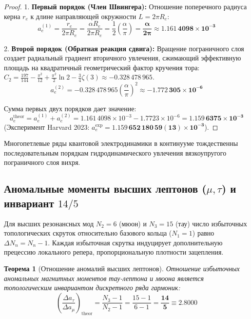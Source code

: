\documentclass[12pt,a4paper]{article}
\newtheorem{theorem}{Теорема}
\begin{document}
	\begin{proof}
		1. \textbf{Первый порядок (Член Швингера):} Отношение поперечного радиуса керна $r_e$ к длине направляющей окружности $L = 2\pi R_e$:
		\begin{equation}
			a_e^{(1)} = \frac{r_e}{2\pi R_e} = \frac{\alpha R_e}{2\pi R_e} = \frac{1}{2} \left(\frac{\alpha}{\pi}\right) = \mathbf{\frac{\alpha}{2\pi}} \approx \mathbf{1.161\,4098 \times 10^{-3}}
		\end{equation}
		
		2. \textbf{Второй порядок (Обратная реакция сдвига):} Вращение пограничного слоя создает радиальный градиент вторичного увлечения, сжимающий эффективную площадь на квадратичный геометрический фактор кручения тора: $C_2 = \frac{197}{144} - \frac{\pi^2}{12} + \frac{\pi^2}{2}\ln 2 - \frac{3}{4}\zeta(3) \approx -0.328\,478\,965$.
		\begin{equation}
			a_e^{(2)} = -0.328\,478\,965 \left(\frac{\alpha}{\pi}\right)^2 \approx \mathbf{-1.772\,305 \times 10^{-6}}
		\end{equation}
		
		Сумма первых двух порядков дает значение:
		\begin{equation}
			a_e^{\text{theor}} = a_e^{(1)} + a_e^{(2)} = 1.161\,4098 \times 10^{-3} - 1.7723 \times 10^{-6} = \mathbf{1.159\,6375 \times 10^{-3}}
		\end{equation}
		(Эксперимент Harvard 2023: $a_e^{\text{exp}} = \mathbf{1.159\,652\,180\,59(13) \times 10^{-3}}$).
	\end{proof}
	Многопетлевые ряды квантовой электродинамики в континууме тождественны последовательным порядкам гидродинамического увлечения вязкоупругого пограничного слоя вихря.
	
	\subsection{Аномальные моменты высших лептонов ($\mu, \tau$) и инвариант $14/5$}
	Для высших резонансных мод $N_2=6$ (мюон) и $N_3=15$ (тау) число избыточных топологических скруток относительно базового кольца ($N_1=1$) равно $\Delta N_n = N_n - 1$. Каждая избыточная скрутка индуцирует дополнительную прецессию локального репера, пропорциональную плотности зацепления.
	
	\begin{theorem}[Отношение аномалий высших лептонов]
		Отношение избыточных аномальных магнитных моментов тау-лептона и мюона является топологическим инвариантом дискретного ряда гармоник:
		\begin{equation}
			\left( \frac{\Delta a_\tau}{\Delta a_\mu} \right)_{\mathrm{theor}} = \frac{N_3 - 1}{N_2 - 1} = \frac{15 - 1}{6 - 1} = \mathbf{\frac{14}{5} \equiv 2.8000}
		\end{equation}
	\end{theorem}
	
\end{document}
